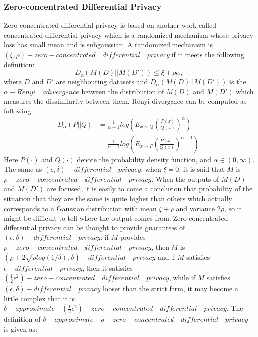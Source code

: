 \documentclass[conference]{IEEEtran}
\begin{document}
\subsubsection{Zero-concentrated Differential Privacy\cite{b30}}
Zero-concentrated differential privacy is based on another work called concentrated differential privacy which is a randomized mechanism whose privacy loss has small mean and is subgaussian. A randomized mechanism is $(\xi, \rho)-zero-concentrated \quad differential \quad privacy$ if it meets the following definition:
\begin{equation}
    D_{\alpha}(M(D)||M(D')) \leq \xi + \rho \alpha,
\end{equation}
where $D$ and $D'$ are neighbouring datasets and $D_{\alpha}(M(D)||M(D'))$ is the $\alpha - R\acute{e}nyi \quad adivergence$ between the distribution of $M(D)$ and $M(D')$ which measures the dissimilarity between them. Rényi divergence can be computed as following:
\begin{equation}
    \begin{split}
        D_{\alpha}(P||Q) &=\frac{1}{\alpha - 1}log(E_{x \sim Q}(\frac{P(x)}{Q(x)})^\alpha)\\
        &=\frac{1}{\alpha - 1}log(E_{x \sim P}(\frac{P(x)}{Q(x)})^{\alpha - 1}).
    \end{split}
\end{equation}
Here $P(\cdot)$ and $Q(\cdot)$ denote the probability density function, and $\alpha \in (0, \infty)$. The same as $(\epsilon, \delta)-differential \quad privacy$, when $\xi = 0$, it is said that $M$ is $\rho-zero-concentrated \quad differential \quad privacy$. When the outputs of $M(D)$ and $M(D')$ are focused, it is easily to come a conclusion that probability of the situation that they are the same is quite higher than others which actually corresponds to a Gaussian distribution with mean $\xi + \rho$ and variance $2\rho$, so it might be difficult to tell where the output comes from. Zero-concentrated differential privacy can be thought to provide guarantees of $(\epsilon, \delta)-differential \quad privacy$: if $M$ provides $\rho-zero-concentrated \quad differential \quad privacy$, then $M$ is $(\rho+2\sqrt{\rho log(1/\delta)}, \delta)-differential \quad privacy$ and if $M$ satisfies $\epsilon-differential \quad privacy$, then it satisfies $(\frac{1}{2}\epsilon^2)-zero-concentrated \quad differential \quad privacy$, while if $M$ satisfies $(\epsilon, \delta)-differential \quad privacy$ looser than the strict form, it may become a little complex that it is $\delta-approximate \quad (\frac{1}{2}\epsilon^2)-zero-concentrated \quad differential \quad privacy$. The definition of $\delta-approximate \quad \rho-zero-concentrated \quad differential \quad privacy$ is given as:
\end{document}
